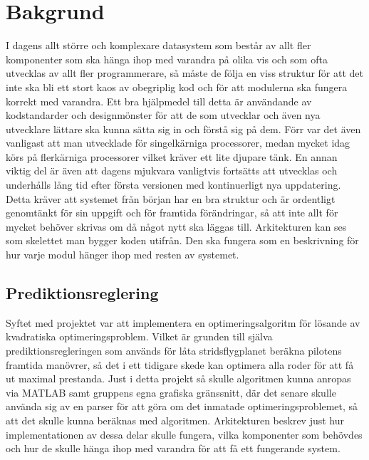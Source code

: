 \section{Bakgrund}
I dagens allt större och komplexare datasystem som består av allt fler komponenter som ska hänga ihop med varandra på olika vis och som ofta utvecklas av allt fler programmerare, så måste de följa en viss struktur för att det inte ska bli ett stort kaos av obegriplig kod och för att modulerna ska fungera korrekt med varandra. Ett bra hjälpmedel till detta är användande av kodstandarder och designmönster för att de som utvecklar och även nya utvecklare lättare ska kunna sätta sig in och förstå sig på dem. Förr var det även vanligast att man utvecklade för singelkärniga processorer, medan mycket idag körs på flerkärniga processorer vilket kräver ett lite djupare tänk. \cite[s. 27--28]{set}
\newline
\newline
En annan viktig del är även att dagens mjukvara vanligtvis fortsätts att utvecklas och underhålls lång tid efter första versionen med kontinuerligt nya uppdatering. Detta kräver att systemet från början har en bra struktur och är ordentligt genomtänkt för sin uppgift och för framtida förändringar, så att inte allt för mycket behöver skrivas om då något nytt ska läggas till. \cite[s. 28--29]{set}
\newline
\newline
Arkitekturen kan ses som skelettet man bygger koden utifrån. Den ska fungera som en beskrivning för hur varje modul hänger ihop med resten av systemet.

\subsection{Prediktionsreglering}
Syftet med projektet var att implementera en optimeringsalgoritm för lösande av kvadratiska optimeringsproblem. Vilket är grunden till själva prediktionsregleringen som används för låta stridsflygplanet beräkna pilotens framtida manövrer, så det i ett tidigare skede kan optimera alla roder för att få ut maximal prestanda.
\newline
\newline
Just i detta projekt så skulle algoritmen kunna anropas via MATLAB samt gruppens egna grafiska gränssnitt, där det senare skulle använda sig av en parser för att göra om det inmatade optimeringsproblemet, så att det skulle kunna beräknas med algoritmen. Arkitekturen beskrev just hur implementationen av dessa delar skulle fungera, vilka komponenter som behövdes och hur de skulle hänga ihop med varandra för att få ett fungerande system.

